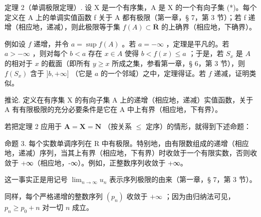 定理 2（单调极限定理）. 设 X 是一个有序集，A 是 X 的一个有向子集 (*)。每个定义在 A 上的单调实值函数 f 关于 A 都有极限（第一章，§ 7，第 3 节）；若 f 递增（相应地，递减），则此极限等于集 \(f(A) \subset \overline{\mathbf{R}}\) 的上确界（相应地，下确界）。

例如设 \(f\) 递增，并令 \(a = \sup f(A)\) 。若 \(a = -\infty\) ，定理是平凡的。若 \(a > -\infty\) ，则对每个 \(b < a\) 存在 \(x \in A\) 使得 \(b < f(x) \leqslant a\) ；于是，若 \(S_x\) 是 \(A\) 的相对于 \(x\) 的截面（即所有 \(y \geqslant x\) 所成之集，参看第一章，§ 6，第 3 节），则 \(f(S_x)\) 含于 \(]b, +\infty]\) （它是 \(a\) 的一个邻域）之中，定理得证。若 \(f\) 递减，证明类似。

推论. 定义在有序集 X 的有向子集 A 上的递增（相应地，递减）实值函数，关于 A 有有限极限的充分必要条件是它在 A 中上有界（相应地，下有界）。

若把定理 2 应用于 \(\mathbf{A} = \mathbf{X} = \mathbf{N}\) （按关系 \(\leqslant\) 定序）的情形，就得到下述命题：

命题 3. 每个实数单调序列在 R 中有极限。特别地，由有限数组成的递增（相应地，递减）序列，当其上有界（相应地，下有界）时收敛于一个有限实数，否则收敛于 +∞（相应地，-∞）。例如，正整数序列收敛于 +∞。

这一事实正是用记号 \(\lim_{n\to \infty}u_n\) 表示序列极限的由来（第一章，§ 7，第 3 节）。

同样，每个严格递增的整数序列 \((p_n)\) 收敛于 \(+\infty\) ；因为由归纳法可见，\(p_n \geqslant p_0 + n\) 对一切 \(n\) 成立。

